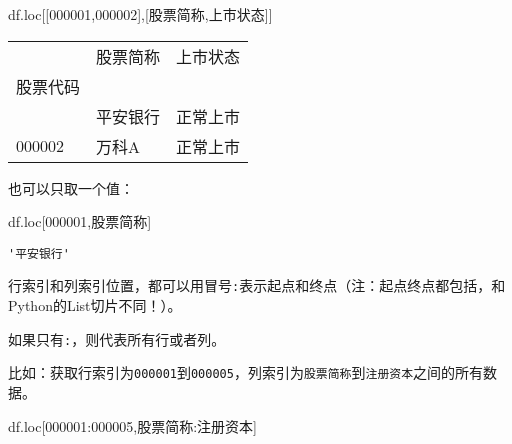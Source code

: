 \documentclass[
  letterpaper,
  DIV=11,
  numbers=noendperiod]{scrreprt}
\newenvironment{Shaded}{\begin{snugshade}}{\end{snugshade}}
\newcommand{\NormalTok}[1]{\textcolor[rgb]{0.00,0.23,0.31}{#1}}
\newcommand{\StringTok}[1]{\textcolor[rgb]{0.13,0.47,0.30}{#1}}
\begin{document}
\begin{Shaded}
\begin{Highlighting}[]
\NormalTok{df.loc[[}\StringTok{\textquotesingle{}000001\textquotesingle{}}\NormalTok{,}\StringTok{\textquotesingle{}000002\textquotesingle{}}\NormalTok{],[}\StringTok{\textquotesingle{}股票简称\textquotesingle{}}\NormalTok{,}\StringTok{\textquotesingle{}上市状态\textquotesingle{}}\NormalTok{]]}
\end{Highlighting}
\end{Shaded}

\begin{longtable}[]{@{}lll@{}}
\toprule\noalign{}
& 股票简称 & 上市状态 \\
股票代码 & & \\
\midrule\noalign{}
\endhead
\bottomrule\noalign{}
\endlastfoot
000001 & 平安银行 & 正常上市 \\
000002 & 万科A & 正常上市 \\
\end{longtable}

也可以只取一个值：

\begin{Shaded}
\begin{Highlighting}[]
\NormalTok{df.loc[}\StringTok{\textquotesingle{}000001\textquotesingle{}}\NormalTok{,}\StringTok{\textquotesingle{}股票简称\textquotesingle{}}\NormalTok{]}
\end{Highlighting}
\end{Shaded}

\begin{verbatim}
'平安银行'
\end{verbatim}

行索引和列索引位置，都可以用冒号\texttt{:}表示起点和终点（注：起点终点都包括，和Python的List切片不同！）。

如果只有\texttt{:}，则代表所有行或者列。

比如：获取行索引为\texttt{000001}到\texttt{000005}，列索引为\texttt{股票简称}到\texttt{注册资本}之间的所有数据。

\begin{Shaded}
\begin{Highlighting}[]
\NormalTok{df.loc[}\StringTok{\textquotesingle{}000001\textquotesingle{}}\NormalTok{:}\StringTok{\textquotesingle{}000005\textquotesingle{}}\NormalTok{,}\StringTok{\textquotesingle{}股票简称\textquotesingle{}}\NormalTok{:}\StringTok{\textquotesingle{}注册资本\textquotesingle{}}\NormalTok{]}
\end{Highlighting}
\end{Shaded}
\end{document}
